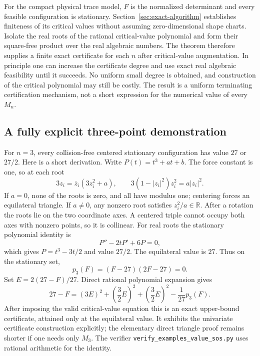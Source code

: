 \documentclass[11pt]{article}
\theoremstyle{remark}
\newcommand{\R}{\mathbb R}
\numberwithin{equation}{section}
\begin{document}
For the compact physical trace model, $F$ is the normalized
determinant and every feasible configuration is stationary.
Section~\ref{sec:exact-algorithm} establishes finiteness of its
critical values without assuming zero-dimensional shape charts.
Isolate the real roots of the rational critical-value polynomial
and form their square-free product over the real algebraic numbers.
The theorem therefore supplies a finite exact certificate for
each $n$ after critical-value augmentation. In principle one can
increase the certificate degree and use exact real algebraic
feasibility until it succeeds. No uniform small degree is obtained,
and construction of the critical polynomial may still be costly.
The result is a uniform terminating certification mechanism, not
a short expression for the numerical value of every $M_n$.

\subsection{A fully explicit three-point demonstration}
For $n=3$, every collision-free centered stationary configuration
has value $27$ or $27/2$. Here is a short derivation. Write
$P(t)=t^3+at+b$. The force constant is one, so at each root
\[
 3z_i=\overline z_i(3z_i^2+a),\qquad
             3(1-|z_i|^2)z_i^2=a|z_i|^2.
\]
If $a=0$, none of the roots is zero, and all have modulus one;
centering forces an equilateral triangle. If $a\ne0$, any nonzero
root satisfies $z_i^2/a\in\R$. After a rotation the roots lie on
the two coordinate axes. A centered triple cannot occupy both
axes with nonzero points, so it is collinear. For real roots the
stationary polynomial identity is
\[
                 P''-2tP'+6P=0,
\]
which gives $P=t^3-3t/2$ and value $27/2$.
The equilateral value is $27$. Thus on the stationary set,
\[
                p_3(F)=(F-27)(2F-27)=0.
\]
Set $E=2(27-F)/27$. Direct rational polynomial expansion gives
\begin{equation}\label{eq:three-point-value-sos}
 27-F=(3E)^2+\left(\frac32 E\right)^2
          +\left(\frac32 E\right)^2-\frac1{27}p_3(F).
\end{equation}
After imposing the valid critical-value equation this is an exact
upper-bound certificate, attained only at the equilateral value.
It exhibits the univariate certificate construction explicitly;
the elementary direct triangle proof remains shorter if one needs
only $M_3$. The verifier \texttt{verify\_examples\_value\_sos.py}
uses rational arithmetic for the identity.
\end{document}
